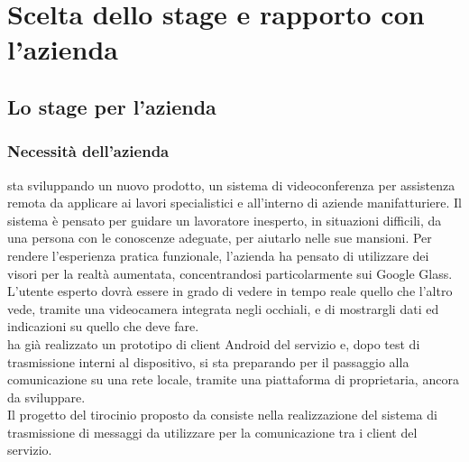 \chapter{Scelta dello stage e rapporto con l'azienda}

\section{Lo stage per l'azienda}

   \subsection{Necessità dell'azienda}
   \nomeAzienda{} sta sviluppando un nuovo prodotto, un sistema di videoconferenza per assistenza remota da applicare ai lavori specialistici e all'interno di aziende manifatturiere. Il sistema è pensato per guidare un lavoratore inesperto, in situazioni difficili, da una persona con le conoscenze adeguate, per aiutarlo nelle sue mansioni. Per rendere l'esperienza pratica funzionale, l'azienda ha pensato di utilizzare dei visori per la realtà aumentata, concentrandosi particolarmente sui Google Glass. L'utente esperto dovrà essere in grado di vedere in tempo reale quello che l'altro vede, tramite una videocamera integrata negli occhiali, e di mostrargli dati ed indicazioni su quello che deve fare.
   \\
   \nomeAzienda{} ha già realizzato un prototipo di client Android del servizio e, dopo test di trasmissione interni al dispositivo, si sta preparando per il passaggio alla comunicazione su una rete locale, tramite una piattaforma di   proprietaria, ancora da sviluppare.
   \\
   Il progetto del tirocinio proposto da \nomeAzienda{} consiste nella realizzazione del sistema di trasmissione di messaggi da utilizzare per la comunicazione tra i client del servizio.

